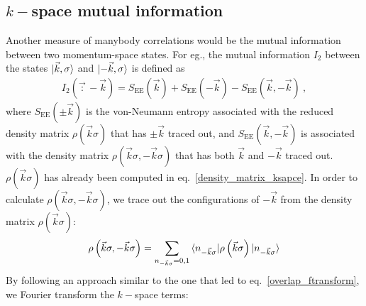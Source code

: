 \documentclass{report}
\numberwithin{equation}{section}
\begin{document}
\subsection{\(k-\)space mutual information}
Another measure of manybody correlations would be the mutual information between two momentum-space states. For eg., the mutual information \(I_2\) between the states \(\ket{\vec k, \sigma}\) and \(\ket{-\vec k, \sigma}\) is defined as
\begin{equation}\begin{aligned}
	I_2(\vec :-\vec k) = S_\text{EE}(\vec k) + S_\text{EE}(-\vec k) - S_\text{EE}(\vec k,-\vec k)~,
\end{aligned}\end{equation}
where \(S_\text{EE}(\pm\vec k)\) is the von-Neumann entropy associated with the reduced density matrix \(\rho\left(\vec k\sigma\right)\) that has \(\pm \vec k\) traced out, and \(S_\text{EE}(\vec k,-\vec k)\) is associated with the density matrix \(\rho\left(\vec k \sigma, -\vec k \sigma\right)\) that has both \(\vec k\) and \(-\vec k\) traced out. \(\rho\left(\vec k\sigma\right)\) has already been computed in eq.~\ref{density_matrix_ksapce}. In order to calculate \(\rho\left(\vec k \sigma, -\vec k \sigma\right)\), we trace out the configurations of \(-\vec k\) from the density matrix \(\rho\left(\vec k\sigma\right)\):
\begin{equation}\begin{aligned}
	\rho\left(\vec k \sigma, -\vec k \sigma\right) = \sum_{n_{-\vec k\sigma}=0,1} \braket{n_{-\vec k\sigma}| \rho\left(\vec k\sigma\right) | n_{-\vec k\sigma}}
\end{aligned}\end{equation}
By following an approach similar to the one that led to eq.~\ref{overlap_ftransform}, we Fourier transform the \(k-\)space terms:
\end{document}
